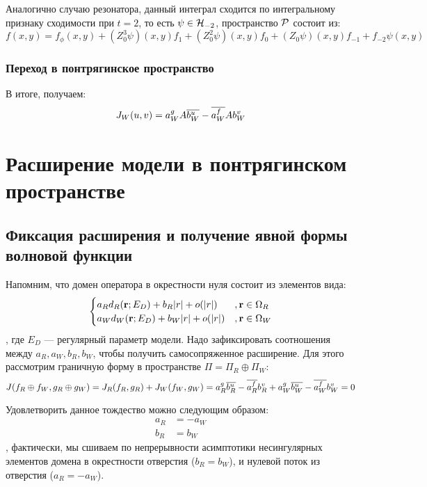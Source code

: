 Аналогично случаю резонатора, данный интеграл сходится по интегральному признаку сходимости при $t = 2$, то есть $\psi \in \mathcal{H}_{-2}$, пространство $\mathcal{P}$ состоит из:
\[
f(x, y) = f_\phi(x, y) + (Z_0^3 \psi)(x, y) f_1 + (Z_0^2 \psi)(x, y) f_0 + (Z_0 \psi)(x, y) f_{-1} + f_{-2} \psi(x, y)
\]


\subsubsection{Переход в понтрягинское пространство}
В итоге, получаем:
\begin{align*}
J_W(u, v) = a_W^g A \overline{b_W^u} - \overline{a_W^f} A b_W^v 
\end{align*}

\section{Расширение модели в понтрягинском пространстве}
\subsection{Фиксация расширения и получение явной формы волновой функции}

Напомним, что домен оператора в окрестности нуля состоит из элементов вида:
\[
\begin{cases}
a_R d_R(\vb{r}; E_D) + b_R |r| + o(|r|)  &, \vb{r} \in \Omega_R \\
a_W d_W(\vb{r}; E_D) + b_W |r| + o(|r|)  &, \vb{r} \in \Omega_W \\
\end{cases}
\], где $E_D$ — регулярный параметр модели. Надо зафиксировать соотношения между $a_R, a_W, b_R, b_W$, чтобы получить самосопряженное расширение. Для этого рассмотрим граничную форму в пространстве $\Pi = \Pi_R \oplus \Pi_W$:
\[
J(f_R \oplus f_W, g_R \oplus g_W) = J_R(f_R, g_R) + J_W(f_W, g_W) = a_R^g \overline{b_R^u} - \overline{a_R^f} b_R^v  + a_W^g \overline{b_W^u} - \overline{a_W^f} b_W^v  = 0
\]

Удовлетворить данное тождество можно следующим образом:
\begin{align*}
a_R &= -a_W \\
b_R &= b_W
\end{align*}
, фактически, мы сшиваем по непрерывности асимптотики несингулярных элементов домена в окрестности отверстия ($b_R = b_W$), и нулевой поток из отверстия ($a_R = -a_W$).

